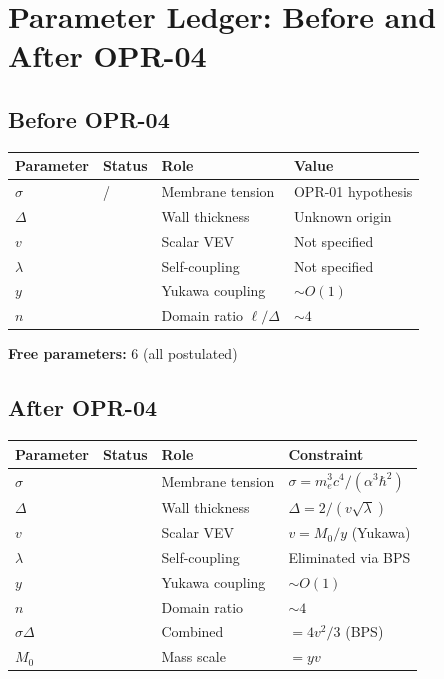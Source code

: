 \section{Parameter Ledger: Before and After OPR-04}
\label{sec:ch16_ledger}

\subsection{Before OPR-04}
\label{subsec:ch16_before}

\begin{center}
\begin{tabular}{llll}
\toprule
\textbf{Parameter} & \textbf{Status} & \textbf{Role} & \textbf{Value} \\
\midrule
$\sigma$ & \tagP{}/\tagDc{} & Membrane tension & OPR-01 hypothesis \\
$\Delta$ & \tagP{} & Wall thickness & Unknown origin \\
$v$ & \tagP{} & Scalar VEV & Not specified \\
$\lambda$ & \tagP{} & Self-coupling & Not specified \\
$y$ & \tagP{} & Yukawa coupling & $\sim O(1)$ \\
$n$ & \tagP{} & Domain ratio $\ell/\Delta$ & $\sim 4$ \\
\bottomrule
\end{tabular}
\end{center}

\textbf{Free parameters:} 6 (all postulated)

\subsection{After OPR-04}
\label{subsec:ch16_after}

\begin{center}
\begin{tabular}{llll}
\toprule
\textbf{Parameter} & \textbf{Status} & \textbf{Role} & \textbf{Constraint} \\
\midrule
$\sigma$ & \tagDc{} & Membrane tension & $\sigma = m_e^3 c^4 / (\alpha^3 \hbar^2)$ \\
$\Delta$ & \tagDc{} & Wall thickness & $\Delta = 2/(v\sqrt{\lambda})$ \\
$v$ & \tagP{} & Scalar VEV & $v = M_0/y$ (Yukawa) \\
$\lambda$ & \tagP{} & Self-coupling & Eliminated via BPS \\
$y$ & \tagP{} & Yukawa coupling & $\sim O(1)$ \\
$n$ & \tagP{} & Domain ratio & $\sim 4$ \\
\midrule
$\sigma\Delta$ & \tagDc{} & Combined & $= 4v^2/3$ (BPS) \\
$M_0$ & \tagDc{} & Mass scale & $= yv$ \\
\bottomrule
\end{tabular}
\end{center}

